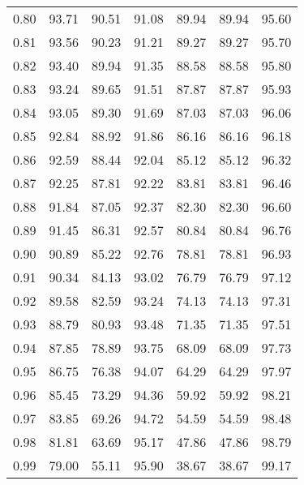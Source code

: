 \begin{tabular}{|c|c|c|c|c|c|c|}
      0.80 &     93.71 &     90.51 &      91.08 &   89.94 &      89.94 &         95.60 \\
      0.81 &     93.56 &     90.23 &      91.21 &   89.27 &      89.27 &         95.70 \\
      0.82 &     93.40 &     89.94 &      91.35 &   88.58 &      88.58 &         95.80 \\
      0.83 &     93.24 &     89.65 &      91.51 &   87.87 &      87.87 &         95.93 \\
      0.84 &     93.05 &     89.30 &      91.69 &   87.03 &      87.03 &         96.06 \\
      0.85 &     92.84 &     88.92 &      91.86 &   86.16 &      86.16 &         96.18 \\
      0.86 &     92.59 &     88.44 &      92.04 &   85.12 &      85.12 &         96.32 \\
      0.87 &     92.25 &     87.81 &      92.22 &   83.81 &      83.81 &         96.46 \\
      0.88 &     91.84 &     87.05 &      92.37 &   82.30 &      82.30 &         96.60 \\
      0.89 &     91.45 &     86.31 &      92.57 &   80.84 &      80.84 &         96.76 \\
      0.90 &     90.89 &     85.22 &      92.76 &   78.81 &      78.81 &         96.93 \\
      0.91 &     90.34 &     84.13 &      93.02 &   76.79 &      76.79 &         97.12 \\
      0.92 &     89.58 &     82.59 &      93.24 &   74.13 &      74.13 &         97.31 \\
      0.93 &     88.79 &     80.93 &      93.48 &   71.35 &      71.35 &         97.51 \\
      0.94 &     87.85 &     78.89 &      93.75 &   68.09 &      68.09 &         97.73 \\
      0.95 &     86.75 &     76.38 &      94.07 &   64.29 &      64.29 &         97.97 \\
      0.96 &     85.45 &     73.29 &      94.36 &   59.92 &      59.92 &         98.21 \\
      0.97 &     83.85 &     69.26 &      94.72 &   54.59 &      54.59 &         98.48 \\
      0.98 &     81.81 &     63.69 &      95.17 &   47.86 &      47.86 &         98.79 \\
      0.99 &     79.00 &     55.11 &      95.90 &   38.67 &      38.67 &         99.17 \\
\bottomrule
\end{tabular}
